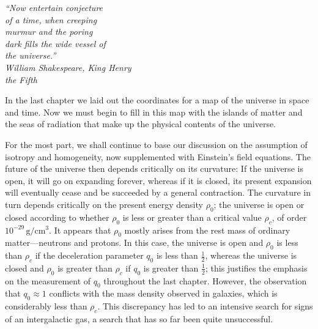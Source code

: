 
\begin{flushright}
\begin{minipage}{0.46\textwidth}
\itshape
``Now entertain conjecture\\
of a time, when creeping\\
murmur and the poring\\
dark fills the wide vessel of\\
the universe.''\\[0.35em]
\normalfont\itshape William Shakespeare, \emph{King Henry\\
the Fifth}
\end{minipage}
\end{flushright}

\bigskip

In the last chapter we laid out the coordinates for a map of the universe in
space and time. Now we must begin to fill in this map with the islands of matter
and the seas of radiation that make up the physical contents of the universe.

For the most part, we shall continue to base our discussion on the assumption
of isotropy and homogeneity, now supplemented with Einstein's field equations.
The future of the universe then depends critically on its curvature: If the
universe is open, it will go on expanding forever, whereas if it is closed, its
present expansion will eventually cease and be succeeded by a general
contraction. The curvature in turn depends critically on the present energy
density \(\rho_0\); the universe is open or closed according to whether
\(\rho_0\) is less or greater than a critical value \(\rho_c\), of order
\(10^{-29}\,\mathrm{g/cm^3}\). It appears that \(\rho_0\) mostly arises from
the rest mass of ordinary matter---neutrons and protons. In this case, the
universe is open and \(\rho_0\) is less than \(\rho_c\) if the deceleration
parameter \(q_0\) is less than \(\tfrac12\), whereas the universe is closed and
\(\rho_0\) is greater than \(\rho_c\) if \(q_0\) is greater than
\(\tfrac12\); this justifies the emphasis on the measurement of \(q_0\)
throughout the last chapter. However, the observation that \(q_0\approx1\)
conflicts with the mass density observed in galaxies, which is considerably less
than \(\rho_c\). This discrepancy has led to an intensive search for signs of an
intergalactic gas, a search that has so far been quite unsuccessful.

